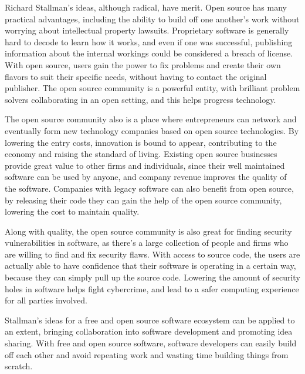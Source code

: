 Richard Stallman's ideas, although radical, have merit.
Open source has many practical advantages, including the ability to build off one another's work without worrying about intellectual property lawsuits.
Proprietary software is generally hard to decode to learn how it works, and even if one was successful, publishing information about the internal workings could be considered a breach of license.
With open source, users gain the power to fix problems and create their own flavors to suit their specific needs, without having to contact the original publisher.
The open source community is a powerful entity, with brilliant problem solvers collaborating in an open setting, and this helps progress technology.

The open source community also is a place where entrepreneurs can network and eventually form new technology companies based on open source technologies.
By lowering the entry costs, innovation is bound to appear, contributing to the economy and raising the standard of living.
Existing open source businesses provide great value to other firms and individuals, since their well maintained software can be used by anyone, and company revenue improves the quality of the software.
Companies with legacy software can also benefit from open source, by releasing their code they can gain the help of the open source community, lowering the cost to maintain quality.

Along with quality, the open source community is also great for finding security vulnerabilities in software, as there's a large collection of people and firms who are willing to find and fix security flaws.
With access to source code, the users are actually able to have confidence that their software is operating in a certain way, because they can simply pull up the source code.
Lowering the amount of security holes in software helps fight cybercrime, and lead to a safer computing experience for all parties involved.

Stallman's ideas for a free and open source software ecosystem can be applied to an extent, bringing collaboration into software development and promoting idea sharing.
With free and open source software, software developers can easily build off each other and avoid repeating work and wasting time building things from scratch.

